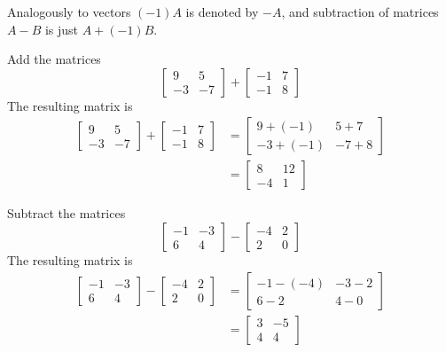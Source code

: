 \documentclass[letterpaper,12pt]{article}
\begin{document}
Analogously to vectors $(-1)A$ is denoted by $-A$, and subtraction of matrices $A - B$ is just $A + (-1)B$.

\begin{example}
Add the matrices
\begin{equation*}
    \begin{bmatrix} 9 & 5 \\ -3 & -7 \end{bmatrix} + \begin{bmatrix} -1 & 7 \\ -1 & 8 \end{bmatrix}
\end{equation*}
The resulting matrix is
\begin{align*}
    \begin{bmatrix} 9 & 5 \\ -3 & -7 \end{bmatrix} + \begin{bmatrix} -1 & 7 \\ -1 & 8 \end{bmatrix} & = \begin{bmatrix} 9 + (-1) & 5 + 7 \\ -3 + (-1) & -7 + 8 \end{bmatrix} \\
    & = \begin{bmatrix} 8 & 12 \\ -4 & 1 \end{bmatrix}
\end{align*}
\end{example}

\begin{example}
Subtract the matrices
\begin{equation*}
    \begin{bmatrix} -1 & -3 \\ 6 & 4 \end{bmatrix} - \begin{bmatrix} -4 & 2 \\ 2 & 0 \end{bmatrix}
\end{equation*}
The resulting matrix is
\begin{align*}
    \begin{bmatrix} -1 & -3 \\ 6 & 4 \end{bmatrix} - \begin{bmatrix} -4 & 2 \\ 2 & 0 \end{bmatrix} & = \begin{bmatrix} -1 - (-4) & -3 - 2 \\ 6 - 2 & 4 - 0 \end{bmatrix} \\
    & = \begin{bmatrix} 3 & -5 \\ 4 & 4 \end{bmatrix}
\end{align*}
\end{example}
\end{document}

